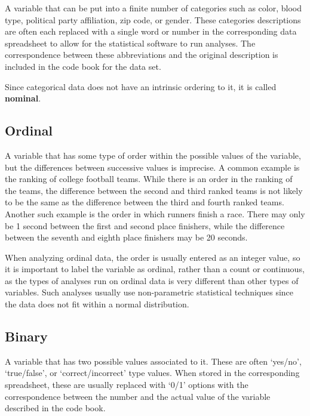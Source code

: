 \documentclass[
]{book}
\theoremstyle{definition}
\theoremstyle{definition}
\theoremstyle{definition}
\theoremstyle{definition}
\theoremstyle{remark}
\begin{document}
A variable that can be put into a finite number of categories such as color, blood type, political party affiliation, zip code, or gender. These categories descriptions are often each replaced with a single word or number in the corresponding data spreadsheet to allow for the statistical software to run analyses. The correspondence between these abbreviations and the original description is included in the code book for the data set.

Since categorical data does not have an intrinsic ordering to it, it is called \textbf{nominal}.

\hypertarget{ordinal}{%
\subsection{Ordinal}\label{ordinal}}

A variable that has some type of order within the possible values of the variable, but the differences between successive values is imprecise. A common example is the ranking of college football teams. While there is an order in the ranking of the teams, the difference between the second and third ranked teams is not likely to be the same as the difference between the third and fourth ranked teams. Another such example is the order in which runners finish a race. There may only be 1 second between the first and second place finishers, while the difference between the seventh and eighth place finishers may be 20 seconds.

When analyzing ordinal data, the order is usually entered as an integer value, so it is important to label the variable as ordinal, rather than a count or continuous, as the types of analyses run on ordinal data is very different than other types of variables. Such analyses usually use non-parametric statistical techniques since the data does not fit within a normal distribution.

\hypertarget{binary}{%
\subsection{Binary}\label{binary}}

A variable that has two possible values associated to it. These are often `yes/no', `true/false', or `correct/incorrect' type values. When stored in the corresponding spreadsheet, these are usually replaced with `0/1' options with the correspondence between the number and the actual value of the variable described in the code book.
\end{document}
